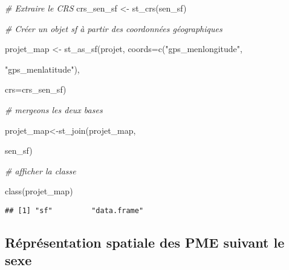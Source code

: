 \documentclass[
  14pt,
]{article}
\newenvironment{Shaded}{\begin{snugshade}}{\end{snugshade}}
\newcommand{\AttributeTok}[1]{\textcolor[rgb]{0.77,0.63,0.00}{#1}}
\newcommand{\CommentTok}[1]{\textcolor[rgb]{0.56,0.35,0.01}{\textit{#1}}}
\newcommand{\FunctionTok}[1]{\textcolor[rgb]{0.00,0.00,0.00}{#1}}
\newcommand{\NormalTok}[1]{#1}
\newcommand{\OtherTok}[1]{\textcolor[rgb]{0.56,0.35,0.01}{#1}}
\newcommand{\StringTok}[1]{\textcolor[rgb]{0.31,0.60,0.02}{#1}}
\begin{document}
\begin{Shaded}
\begin{Highlighting}[]
\CommentTok{\# Extraire le CRS}
\NormalTok{crs\_sen\_sf }\OtherTok{\textless{}{-}} \FunctionTok{st\_crs}\NormalTok{(sen\_sf)}

\CommentTok{\# Créer un objet sf à partir des coordonnées géographiques}

\NormalTok{ projet\_map }\OtherTok{\textless{}{-}} \FunctionTok{st\_as\_sf}\NormalTok{(projet,}
                        \AttributeTok{coords=}\FunctionTok{c}\NormalTok{(}\StringTok{"gps\_menlongitude"}\NormalTok{,}
                                 
                                 \StringTok{"gps\_menlatitude"}\NormalTok{),}
                        
                        \AttributeTok{crs=}\NormalTok{crs\_sen\_sf)}
 
\CommentTok{\# mergeons les deux bases }
 
\NormalTok{projet\_map}\OtherTok{\textless{}{-}}\FunctionTok{st\_join}\NormalTok{(projet\_map,}
                    
\NormalTok{                    sen\_sf)}

\CommentTok{\# afficher la classe }

\FunctionTok{class}\NormalTok{(projet\_map) }
\end{Highlighting}
\end{Shaded}

\begin{verbatim}
## [1] "sf"         "data.frame"
\end{verbatim}

\newpage

\hypertarget{ruxe9pruxe9sentation-spatiale-des-pme-suivant-le-sexe}{%
\subsection{\texorpdfstring{Réprésentation spatiale des PME suivant le
sexe\\
}{Réprésentation spatiale des PME suivant le sexe }}\label{ruxe9pruxe9sentation-spatiale-des-pme-suivant-le-sexe}}
\end{document}
